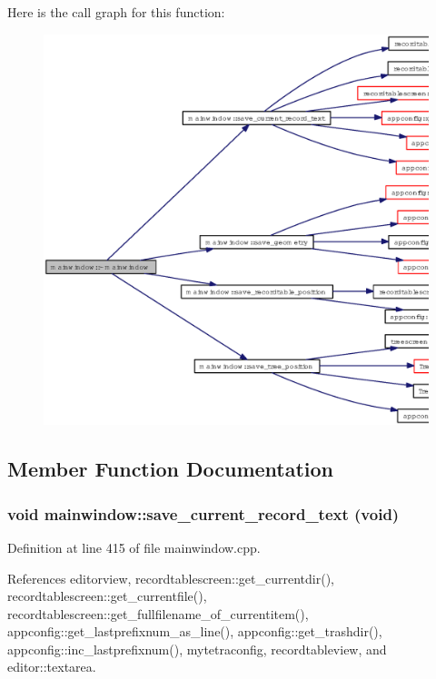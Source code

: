 Here is the call graph for this function:\begin{figure}[H]
\begin{center}
\leavevmode
\includegraphics[width=386pt]{classmainwindow_5443e012964c892ef6015e7cebf62a67_cgraph}
\end{center}
\end{figure}


\subsection{Member Function Documentation}
\subsubsection{\setlength{\rightskip}{0pt plus 5cm}void mainwindow::save\_\-current\_\-record\_\-text (void)}\label{classmainwindow_5584aaad939eac61d3e5e9e09e666016}




Definition at line 415 of file mainwindow.cpp.

References editorview, recordtablescreen::get\_\-currentdir(), recordtablescreen::get\_\-currentfile(), recordtablescreen::get\_\-fullfilename\_\-of\_\-currentitem(), appconfig::get\_\-lastprefixnum\_\-as\_\-line(), appconfig::get\_\-trashdir(), appconfig::inc\_\-lastprefixnum(), mytetraconfig, recordtableview, and editor::textarea.

